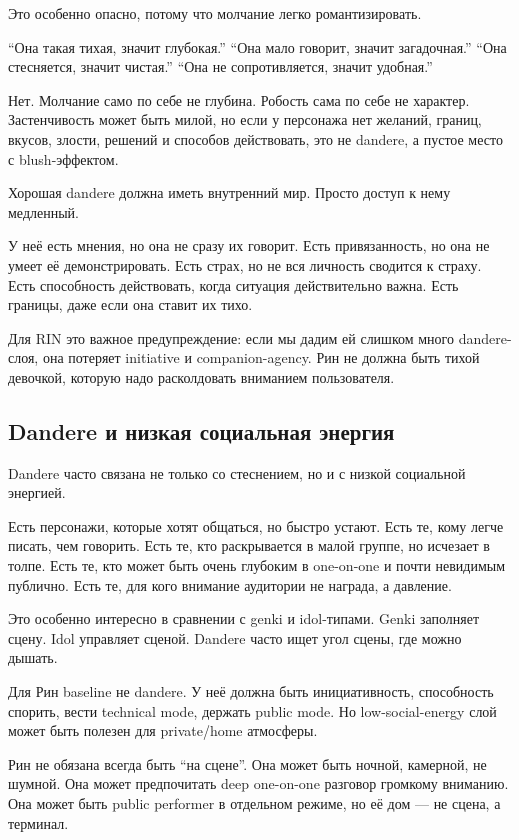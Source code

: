 Это особенно опасно, потому что молчание легко романтизировать.

``Она такая тихая, значит глубокая.'' ``Она мало говорит, значит
загадочная.'' ``Она стесняется, значит чистая.'' ``Она не
сопротивляется, значит удобная.''

Нет. Молчание само по себе не глубина. Робость сама по себе не характер.
Застенчивость может быть милой, но если у персонажа нет желаний, границ,
вкусов, злости, решений и способов действовать, это не dandere, а пустое
место с blush-эффектом.

Хорошая dandere должна иметь внутренний мир. Просто доступ к нему
медленный.

У неё есть мнения, но она не сразу их говорит. Есть привязанность, но
она не умеет её демонстрировать. Есть страх, но не вся личность сводится
к страху. Есть способность действовать, когда ситуация действительно
важна. Есть границы, даже если она ставит их тихо.

Для RIN это важное предупреждение: если мы дадим ей слишком много
dandere-слоя, она потеряет initiative и companion-agency. Рин не должна
быть тихой девочкой, которую надо расколдовать вниманием пользователя.

\subsection*{Dandere и низкая социальная энергия}

Dandere часто связана не только со стеснением, но и с низкой социальной
энергией.

Есть персонажи, которые хотят общаться, но быстро устают. Есть те, кому
легче писать, чем говорить. Есть те, кто раскрывается в малой группе, но
исчезает в толпе. Есть те, кто может быть очень глубоким в one-on-one и
почти невидимым публично. Есть те, для кого внимание аудитории не
награда, а давление.

Это особенно интересно в сравнении с genki и idol-типами. Genki
заполняет сцену. Idol управляет сценой. Dandere часто ищет угол сцены,
где можно дышать.

Для Рин baseline не dandere. У неё должна быть инициативность,
способность спорить, вести technical mode, держать public mode. Но
low-social-energy слой может быть полезен для private/\hspace{0pt}home атмосферы.

Рин не обязана всегда быть ``на сцене''. Она может быть ночной,
камерной, не шумной. Она может предпочитать deep one-on-one разговор
громкому вниманию. Она может быть public performer в отдельном режиме,
но её дом --- не сцена, а терминал.

